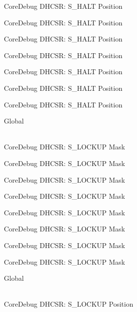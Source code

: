 \begin{DoxyRefList}
\label{deprecated__deprecated000117}%
%
Core\+Debug DHCSR\+: S\+\_\+\+HALT Position 

\label{deprecated__deprecated000171}%
%
Core\+Debug DHCSR\+: S\+\_\+\+HALT Position 

\label{deprecated__deprecated000256}%
%
Core\+Debug DHCSR\+: S\+\_\+\+HALT Position 

\label{deprecated__deprecated000313}%
%
Core\+Debug DHCSR\+: S\+\_\+\+HALT Position 

\label{deprecated__deprecated000389}%
%
Core\+Debug DHCSR\+: S\+\_\+\+HALT Position 

\label{deprecated__deprecated000476}%
%
Core\+Debug DHCSR\+: S\+\_\+\+HALT Position 

\label{deprecated__deprecated000578}%
%
Core\+Debug DHCSR\+: S\+\_\+\+HALT Position  
\item[{\parbox[t]{\linewidth}{Global \doxylink{group___c_m_s_i_s___core_debug_ga7b67e4506d7f464ef5dafd6219739756}{Core\+Debug\+\_\+\+DHCSR\+\_\+\+S\+\_\+\+LOCKUP\+\_\+\+Msk} }}]\hfill \\
\label{deprecated__deprecated000022}%
%
Core\+Debug DHCSR\+: S\+\_\+\+LOCKUP Mask 

\label{deprecated__deprecated000114}%
%
Core\+Debug DHCSR\+: S\+\_\+\+LOCKUP Mask 

\label{deprecated__deprecated000168}%
%
Core\+Debug DHCSR\+: S\+\_\+\+LOCKUP Mask 

\label{deprecated__deprecated000253}%
%
Core\+Debug DHCSR\+: S\+\_\+\+LOCKUP Mask 

\label{deprecated__deprecated000310}%
%
Core\+Debug DHCSR\+: S\+\_\+\+LOCKUP Mask 

\label{deprecated__deprecated000386}%
%
Core\+Debug DHCSR\+: S\+\_\+\+LOCKUP Mask 

\label{deprecated__deprecated000473}%
%
Core\+Debug DHCSR\+: S\+\_\+\+LOCKUP Mask 

\label{deprecated__deprecated000575}%
%
Core\+Debug DHCSR\+: S\+\_\+\+LOCKUP Mask  
\item[{\parbox[t]{\linewidth}{Global \doxylink{group___c_m_s_i_s___core_debug_ga2900dd56a988a4ed27ad664d5642807e}{Core\+Debug\+\_\+\+DHCSR\+\_\+\+S\+\_\+\+LOCKUP\+\_\+\+Pos} }}]\hfill \\
\label{deprecated__deprecated000021}%
%
Core\+Debug DHCSR\+: S\+\_\+\+LOCKUP Position 


\end{DoxyRefList}
